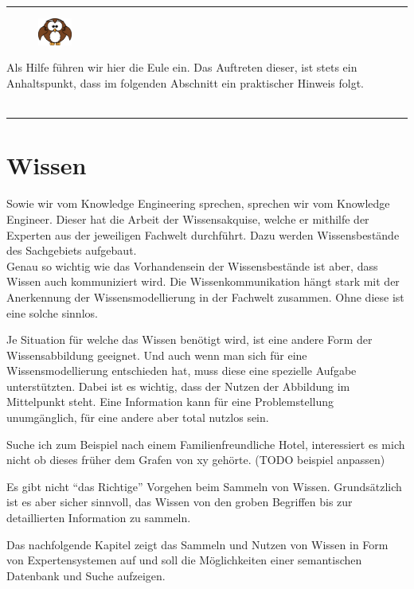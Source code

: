 \noindent\rule[1ex]{\textwidth}{1pt}
\vspace{0.1pt}
\begin{figure}
    \vspace{-19pt}
    \includegraphics[width=0.1\textwidth]{bilder/owl.png}
\end{figure}
Als Hilfe führen wir hier die Eule ein. Das Auftreten dieser, ist stets ein Anhaltspunkt, dass im folgenden Abschnitt ein praktischer Hinweis folgt.\\
\\

\noindent\rule[1ex]{\textwidth}{1pt}

\newpage

\section{Wissen}
\label{chap:einleitung_wissen}


Sowie wir vom Knowledge Engineering sprechen, sprechen wir vom Knowledge Engineer. Dieser hat die Arbeit der Wissensakquise, welche er mithilfe der Experten aus der jeweiligen Fachwelt durchführt. Dazu werden Wissensbestände des Sachgebiets aufgebaut. \\
Genau so wichtig wie das Vorhandensein der Wissensbestände ist aber, dass Wissen auch kommuniziert wird. Die Wissenkommunikation hängt stark mit der Anerkennung der Wissensmodellierung in der Fachwelt zusammen. Ohne diese ist eine solche sinnlos.
 
Je Situation für welche das Wissen benötigt wird, ist eine andere Form der Wissensabbildung geeignet. Und auch wenn man sich für eine Wissensmodellierung entschieden hat, muss diese eine spezielle Aufgabe unterstützten. Dabei ist es wichtig, dass der Nutzen der Abbildung im Mittelpunkt steht. Eine Information kann für eine Problemstellung unumgänglich, für eine andere aber total nutzlos sein.

\noindent\hspace*{15mm}Suche ich zum Beispiel nach einem Familienfreundliche Hotel, interessiert es mich nicht ob dieses früher dem Grafen von xy gehörte. (TODO beispiel anpassen)

Es gibt nicht ``das Richtige'' Vorgehen beim Sammeln von Wissen. Grundsätzlich ist es aber sicher sinnvoll, das Wissen von den groben Begriffen bis zur detaillierten Information zu sammeln.

Das nachfolgende Kapitel zeigt das Sammeln und Nutzen von Wissen in Form von Expertensystemen auf und soll die Möglichkeiten einer semantischen Datenbank und Suche aufzeigen.
